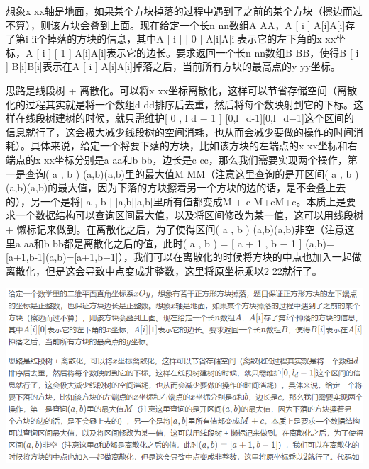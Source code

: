 \documentclass[9pt, b5paaper]{book}
\begin{document}
\begin{enumerate}
想象x xx轴是地面，如果某个方块掉落的过程中遇到了之前的某个方块（擦边而过不算），则该方块会叠到上面。现在给定一个长n nn数组A AA，A [ i ] A[i]A[i]存了第i ii个掉落的方块的信息，其中A [ i ] [ 0 ] A[i]\footnotemark[1]{}A[i]\footnotemark[1]{}表示它的左下角的x xx坐标，A [ i ] [ 1 ] A[i]\footnotemark[2]{}A[i]\footnotemark[2]{}表示它的边长。要求返回一个长n nn数组B BB，使得B [ i ] B[i]B[i]表示在A [ i ] A[i]A[i]掉落之后，当前所有方块的最高点的y yy坐标。

思路是线段树 + 离散化。可以将x xx坐标离散化，这样可以节省存储空间（离散化的过程其实就是将一个数组d dd排序后去重，然后将每个数映射到它的下标。这样在线段树建树的时候，就只需维护[ 0 , l d − 1 ] [0,l\_d-1][0,l\_d−1]这个区间的信息就行了，这会极大减少线段树的空间消耗，也从而会减少要做的操作的时间消耗）。具体来说，给定一个将要下落的方块，比如该方块的左端点的x xx坐标和右端点的x xx坐标分别是a aa和b bb，边长是c cc，那么我们需要实现两个操作，第一是查询( a , b ) (a,b)(a,b)里的最大值M MM（注意这里查询的是开区间( a , b ) (a,b)(a,b)的最大值，因为下落的方块擦着另一个方块的边的话，是不会叠上去的），另一个是将[ a , b ] [a,b][a,b]里所有值都变成M + c M+cM+c。本质上是要求一个数据结构可以查询区间最大值，以及将区间修改为某一值，这可以用线段树 + 懒标记来做到。在离散化之后，为了使得区间( a , b ) (a,b)(a,b)非空（注意这里a aa和b bb都是离散化之后的值，此时( a , b ) = [ a + 1 , b − 1 ] (a,b)=[a+1,b-1](a,b)=[a+1,b−1]），我们可以在离散化的时候将方块的中点也加入一起做离散化，但是这会导致中点变成非整数，这里将原坐标乘以2 22就行了。

\includegraphics[width=.9\linewidth]{./pic/699.png}


\end{enumerate}
\end{document}
